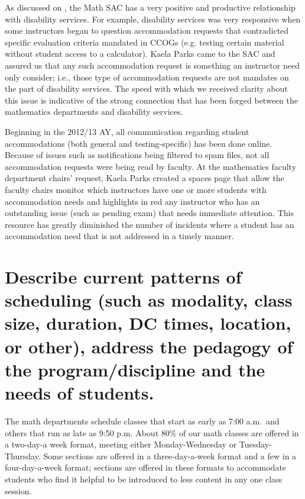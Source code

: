 
As discussed on , the Math SAC has a very positive and productive relationship with disability services.
For example, disability services was very responsive when some instructors began to question accommodation requests that contradicted specific evaluation criteria mandated in CCOGs (e.g. testing certain material without student access to a calculator).
Kaela Parks came to the SAC and assured us that any such accommodation request is something an instructor need only consider; i.e., those type of accommodation requests are not mandates on the part of disability services.
The speed with which we received clarity about this issue is indicative of the strong connection that has been forged between the mathematics departments and disability services.

Beginning in the 2012/13 AY, all communication regarding student accommodations (both general and testing-specific) has been done online.
Because of issues such as notifications being filtered to spam files, not all accommodation requests were being read by faculty.
At the  mathematics faculty department chairs' request, Kaela Parks created a spaces page that allow the faculty chairs monitor which instructors have one or more students with accommodation needs and highlights in red any instructor who has an outstanding issue (such as pending exam) that needs immediate attention.
This resource has greatly diminished the number of incidents where a student has an accommodation need that is not addressed in a timely manner.

\section[Patterns of scheduling]{Describe current patterns of scheduling (such
  as modality, class size, duration, DC times, location, or other), address the
  pedagogy of the program/discipline and the needs of students.}
\label{facilities:sec:scheduling}
The math departments schedule classes that start as early as 7:00 {\sc a.m.}\ and others that run as late as 9:50 {\sc p.m.}  About 80\% of our math classes are offered in a two-day-a week format, meeting either Monday-Wednesday or Tuesday-Thursday.
Some sections are offered in a three-day-a-week format and a few in a four-day-a-week format; sections are offered in these formats to accommodate students who find it helpful to be introduced to less content in any one class session.

